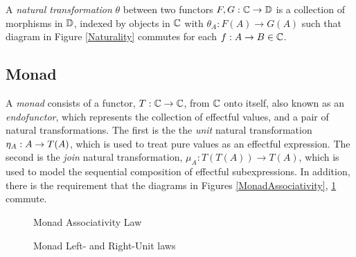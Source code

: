 \documentclass{Report}
\begin{document}
A \textit{natural transformation} $\theta$ between two functors $F, G: \mathbb{C} \rightarrow \mathbb{D}$ is a collection of morphisms in $\mathbb{D}$, indexed by objects in $\mathbb{C}$ with  $\theta_A: F(A) \rightarrow G(A)$ such that diagram in Figure \ref{Naturality} commutes for each $f: A \rightarrow B \in \mathbb{C}$.



\subsection{Monad}
A \textit{monad} consists of a functor, $T: \mathbb{C} \rightarrow \mathbb{C}$, from $\mathbb{C}$ onto itself, also known as an \textit{endofunctor}, which represents the collection of effectful values, and a pair of natural transformations. The first is the the \textit{unit} natural transformation $\eta_{A}: A\rightarrow T(A)$, which is used to treat pure values as an effectful expression. The second is the \textit{join} natural transformation, $\mu_{A}: T(T(A)) \rightarrow T(A)$,  which is used to model the sequential composition of effectful subexpressions. In addition, there is the requirement that the diagrams in Figures \ref{MonadAssociativity}, \ref{MonadUnits} commute.


\begin{figure}
        \centering
        \begin{minipage}{0.45\textwidth}
            \centering
            \begin{framed}
            \end{framed}
            \caption{Monad Associativity Law}
            \label{MonadAssociativity}
        \end{minipage}\hfill
        \begin{minipage}{0.45\textwidth}
            \centering
            \begin{framed}
                
            \end{framed}
            \caption{Monad Left- and Right-Unit laws}
            \label{MonadUnits}
        \end{minipage}
\end{figure}
\end{document}
